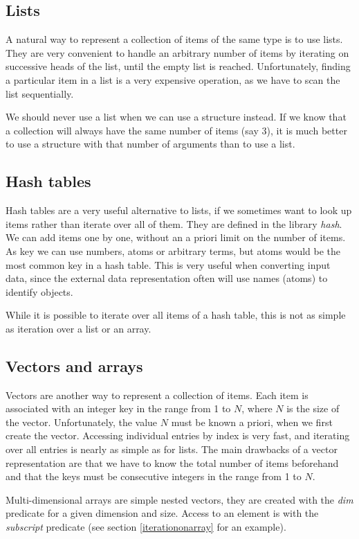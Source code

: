 \documentclass[a4paper,12pt]{report}
\begin{document}
\subsection{Lists}
A natural way to represent a collection of items of the same type is to use lists. They are very convenient to handle an arbitrary number of items by iterating on successive heads of the list, until the empty list is reached. Unfortunately, finding a particular item in a list is a very expensive operation, as we have to scan the list sequentially.

We should never use a list when we can use a structure instead. If we know that a collection will always have the same number of items (say 3), it is much better to use a structure with that number of arguments than to use a list. 

\subsection{Hash tables}
Hash tables are a very useful alternative to lists, if we sometimes want to look up items rather than iterate over all of them. They are defined in the library {\it hash}.
We can add items one by one, without an a priori limit on the number of items.
As key we can use numbers, atoms or arbitrary terms, but atoms would be the most common key in a hash table. This is very useful when converting input data, since the external data representation often will use names (atoms) to identify objects.

While it is possible to iterate over all items of a hash table, this is not as simple as iteration over a list or an array.

\subsection{Vectors and arrays}
Vectors are another way to represent a collection of items. Each item is associated with an integer key in the range from 1 to $N$, where $N$ is the size of the vector. Unfortunately, the value $N$ must be known a priori, when we first create the vector. Accessing individual entries by index is very fast, and iterating over all entries is nearly as simple as for lists. The main drawbacks of a vector representation are that we have to know the total number of items beforehand and that the keys must be consecutive integers in the range from 1 to $N$.

Multi-dimensional arrays are simple nested vectors, they are created with the {\it dim} predicate for a given dimension and size. Access to an element is with the {\it subscript} predicate (see section \ref{iterationonarray} for an example).
\end{document}
